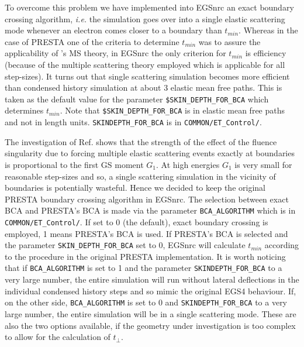 To overcome this problem we have implemented into EGSnrc an
exact boundary crossing algorithm, {\em i.e.} the simulation
goes over into a single elastic scattering mode whenever
an electron comes closer to a
boundary than $t_{min}$.
Whereas in the case of PRESTA one of
the criteria to determine $t_{min}$ was to assure the
applicability of \Mol's MS theory, in EGSnrc the only criterion
for $t_{min}$ is efficiency (because of the multiple scattering theory
employed which is applicable for all step-sizes). It turns out that single
scattering simulation becomes more efficient than condensed history
simulation at about
3 elastic mean free paths. This is taken as the default value
for the parameter {\tt \$SKIN\_DEPTH\_FOR\_BCA} which determines
$t_{min}$. Note that {\tt \$SKIN\_DEPTH\_FOR\_BCA} is in
elastic mean free paths and not in length units.
{\tt SKINDEPTH\_FOR\_BCA} is in {\tt COMMON/ET\_Control/}.

 
The investigation of Ref. \cite{Ka99b} shows that the
strength of the effect of the fluence singularity
due to forcing multiple elastic scattering events exactly
at boundaries is proportional to the first GS moment $G_1$.
At high energies $G_1$ is very small for reasonable step-sizes and
so, a single scattering simulation in the vicinity of
boundaries is potentially wasteful. Hence we decided to keep
the original PRESTA boundary crossing algorithm in EGSnrc. The selection
between exact BCA and PRESTA's BCA is made via the parameter
{\tt BCA\_ALGORITHM} which is in {\tt COMMON/ET\_Control/}.
If set to 0 (the default), exact boundary crossing is employed,
1 means PRESTA's BCA is used. If PRESTA's BCA is selected
and the parameter {\tt SKIN\_DEPTH\_FOR\_BCA} set to 0,
EGSnrc will calculate $t_{min}$ according to the procedure
in the original PRESTA implementation. It is worth noticing
that if {\tt BCA\_ALGORITHM} is set to 1 and the parameter
{\tt SKINDEPTH\_FOR\_BCA} to a very large number,
the entire simulation will run without lateral deflections
in the individual condensed history steps and so
mimic the original EGS4 behaviour. If, on the other side,
{\tt BCA\_ALGORITHM} is set to 0 and {\tt SKINDEPTH\_FOR\_BCA}
to a very large number, the entire simulation will be in
a single scattering mode. These are also the two options
available, if the geometry under investigation is
too complex to allow for the calculation of $t_\perp$.

